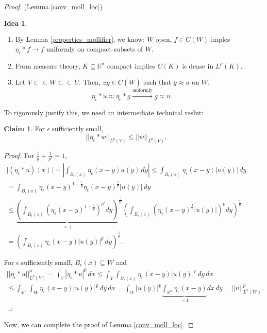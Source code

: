 \documentclass[12pt]{article}
\theoremstyle{definition}
\newtheorem*{claim*}{Claim}
\newtheorem*{idea}{Idea}
\begin{document}
\begin{proof}
(Lemma \ref{conv_moll_loc})
\begin{idea}
\begin{enumerate}[label=\arabic*.]
\item By Lemma \ref{properties_mollifier}, we know: $W$ open, $f\in C(W)$ imples $\eta_{\epsilon}*f\rightarrow f$ uniformly on compact subsets of $W$.

\item From measure theory, $K\subseteq\mathbb{R}^n$ compact implies $C(K)$ is dense in $L^p(K)$.

\item Let $V\subset\subset W\subset\subset U$. Then, $\exists g\in C(\overline{W})$ such that $g\approx u$ on $W$.
\[\eta_{\epsilon}*u\approx\eta_{\epsilon}*g\xrightarrow{\text{uniformly}}g\approx u.\]
\end{enumerate}
\end{idea}

To rigorously justify this, we need an intermediate technical reslut:
\begin{claim*}
For $\epsilon$ sufficiently small,
\[||\eta_{\epsilon}*w||_{L^p(V)}\leq||w||_{L^p(V)}.\]
\end{claim*}

\begin{proof}
For $\frac{1}{p}+\frac{1}{p'}=1$,
\begin{multline*}
\big|(\eta_{\epsilon}*u)(x)\big|=\left|\int_{B_{\epsilon}(x)}\eta_{\epsilon}(x-y)u(y)\,dy\right|\leq\int_{B_{\epsilon}(x)}\eta_{\epsilon}(x-y)|u(y)|\,dy\\
=\int_{B_{\epsilon}(x)}\eta_{\epsilon}(x-y)^{1-\frac{1}{p}}\eta_{\epsilon}(x-y)^{\frac{1}{p}}|u(y)|\,dy\\
\leq{\underbrace{\left(\int_{B_{\epsilon}(x)}\left(\eta_{\epsilon}(x-y)^{1-\frac{1}{p}}\right)^{p'}dy\right)}_{=1}}^{\frac{1}{p'}}\left(\int_{B_{\epsilon}(x)}\left(\eta_{\epsilon}(x-y)^{\frac{1}{p}}|u(y)|\right)^pdy\right)^{\frac{1}{p}}\\
=\left(\int_{B_{\epsilon}(x)}\eta_{\epsilon}(x-y)|u(y)|^p\,dy\right)^{\frac{1}{p}}.
\end{multline*}

For $\epsilon$ sufficiently small, $B_{\epsilon}(x)\subseteq W$ and
\begin{multline*}
||\eta_{\epsilon}*u||_{L^p(V)}^p=\int_V|\eta_{\epsilon}*u|^p\,dx\leq\int_V\int_{B_{\epsilon}(x)}\eta_{\epsilon}(x-y)|u(y)|^p\,dy\,dx\\
\leq\int_{\mathbb{R}^n}\int_W\eta_{\epsilon}(x-y)|u(y)|^p\,dy\,dx=\int_W|u(y)|^p\underbrace{\int_{\mathbb{R}^n}\eta_{\epsilon}(x-y)}_{=1}dx\,dy=||u||_{L^p(W)}^p.
\end{multline*}
\end{proof}
Now, we can complete the proof of Lemma \ref{conv_moll_loc}.


\end{proof}
\end{document}
